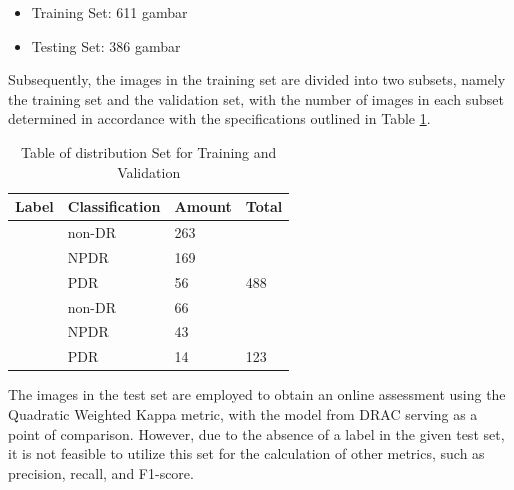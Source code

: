 	\begin{itemize}
		\item Training Set: 611 gambar
		\item Testing Set: 386 gambar
	\end{itemize}
Subsequently, the images in the training set are divided into two subsets, namely the training set and the validation set, with the number of images in each subset determined in accordance with the specifications outlined in Table \ref{table:Datasettraining}.
\begin{table}[hbtp]
	\begin{center}
	\caption{Table of distribution Set for Training and Validation}
	\label{table:Datasettraining}
	\begin{tabular}{|l|l|l|l|}
		\hline
		\rowcolor[HTML]{C0C0C0} 
		Label                                                & Classification & Amount & Total                                         \\ \hline
		\rowcolor[HTML]{FFFFFF} 
		\cellcolor[HTML]{FFFFFF}                             & non-DR      & 263    & \cellcolor[HTML]{FFFFFF}                      \\ \cline{2-3}
		\rowcolor[HTML]{FFFFFF} 
		\cellcolor[HTML]{FFFFFF}                             & NPDR        & 169    & \cellcolor[HTML]{FFFFFF}                      \\ \cline{2-3}
		\rowcolor[HTML]{FFFFFF} 
		\multirow{-3}{*}{\cellcolor[HTML]{FFFFFF}Training}   & PDR         & 56     & \multirow{-3}{*}{\cellcolor[HTML]{FFFFFF}488} \\ \hline
		\rowcolor[HTML]{FFFFFF} 
		\cellcolor[HTML]{FFFFFF}                             & non-DR      & 66     & \cellcolor[HTML]{FFFFFF}                      \\ \cline{2-3}
		\rowcolor[HTML]{FFFFFF} 
		\cellcolor[HTML]{FFFFFF}                             & NPDR        & 43     & \cellcolor[HTML]{FFFFFF}                      \\ \cline{2-3}
		\rowcolor[HTML]{FFFFFF} 
		\multirow{-3}{*}{\cellcolor[HTML]{FFFFFF}Validation} & PDR         & 14     & \multirow{-3}{*}{\cellcolor[HTML]{FFFFFF}123} \\ \hline
		\end{tabular}
	\end{center}
\end{table}

The images in the test set are employed to obtain an online assessment using the Quadratic Weighted Kappa metric, with the model from DRAC serving as a point of comparison. However, due to the absence of a label in the given test set, it is not feasible to utilize this set for the calculation of other metrics, such as precision, recall, and F1-score.


